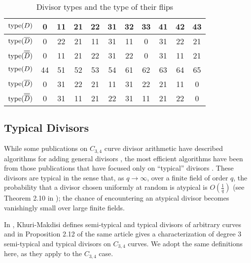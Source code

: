 \begin{table}[h!]
\caption{Divisor types and the type of their flips}
\label{tab_large_flip_type}
\begin{center}
  \begin{tabular}{r|cccccccccc}
    $\operatorname{type}(D)$             & 0 & 11 & 21 & 22 & 31 & 32 & 33 & 41 & 42 & 43 \\
    \hline
    $\operatorname{type}(\overline D)$        & 0 & 22 & 21 & 11 & 31 & 11 &  0 & 31 & 22 & 21 \\
    $\operatorname{type}(\overline {\overline D})$ & 0 & 11 & 21 & 22 & 31 & 22 &  0 & 31 & 11 & 21 \\
    \hline\hline
    $\operatorname{type}(D)$             & 44 & 51 & 52 & 53 & 54 & 61 & 62 & 63 & 64 & 65 \\
    \hline
    $\operatorname{type}(\overline D)$        &  0 & 31 & 22 & 21 & 11 & 31 & 22 & 21 & 11 &  0 \\
    $\operatorname{type}(\overline {\overline D})$ &  0 & 31 & 11 & 21 & 22 & 31 & 11 & 21 & 22 &  0 \\
  \end{tabular}
\end{center}
\end{table}



\subsection{Typical Divisors}

While some publications on $C_{3,4}$ curve divisor arithmetic have described algorithms for adding general divisors
\cite{arita05-2, harasawa00},
the most efficient algorithms have been from those publications that have focused only on ``typical'' divisors
\cite{salem07, kmakdisi18, flon08}.
These divisors are typical in the sense that, as $q \to \infty$,
over a finite field of order $q$,
the probability that a divisor chosen uniformly at random is atypical is $O\left(\frac 1 q\right)$ (see Theorem 2.10 in \cite{kmakdisi18});
the chance of encountering an atypical divisor becomes vanishingly small over large finite fields.

In \cite{kmakdisi18}, Khuri-Makdisi defines semi-typical and typical divisors of arbitrary curves
and in Proposition 2.12 of the same article gives a characterization of degree 3
semi-typical and typical divisors on $C_{3,4}$ curves.
We adopt the same definitions here, as they apply to the $C_{3,4}$ case.

